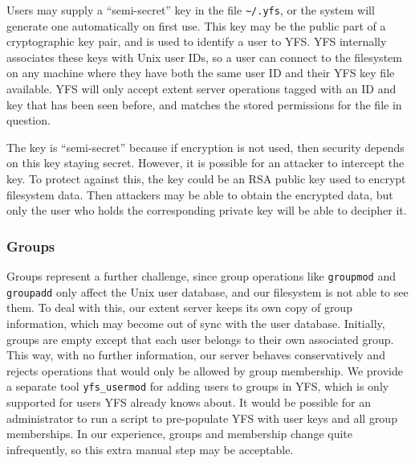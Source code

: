 \documentclass[12pt]{article}
\begin{document}
Users may supply a ``semi-secret'' key in the file {\tt \~{}/.yfs}, or
the system will generate one automatically on first use. This key may
be the public part of a cryptographic key pair, and is used to identify
a user to YFS. YFS internally associates these keys with Unix user IDs,
so a user can connect to the filesystem on any machine where they have
both the same user ID and their YFS key file available. YFS will
only accept extent server operations tagged with an ID and key that has
been seen before, and matches the stored permissions for the file in
question.

The key is ``semi-secret'' because if encryption is not used, then
security depends on this key staying secret. However, it is possible
for an attacker to intercept the key. To protect against this, the
key could be an RSA public key used to encrypt filesystem data. Then
attackers may be able to obtain the encrypted data, but only the user
who holds the corresponding private key will be able to decipher it.

\subsubsection{Groups}

Groups represent a further challenge, since group operations like
{\tt groupmod} and {\tt groupadd} only affect the Unix user database,
and our filesystem is not able to see them. To deal with this, our
extent server keeps its own copy of group information, which may become
out of sync with the user database. Initially, groups are empty except
that each user belongs to their own associated group. This way, with
no further information, our server behaves conservatively and rejects
operations that would only be allowed by group membership. We provide
a separate tool {\tt yfs\_usermod} for adding users to groups in YFS,
which is only supported for users YFS already knows about. It would be
possible for an administrator to run a script to pre-populate YFS
with user keys and all group memberships. In our experience, groups
and membership change quite infrequently, so this extra manual step
may be acceptable.
\end{document}

